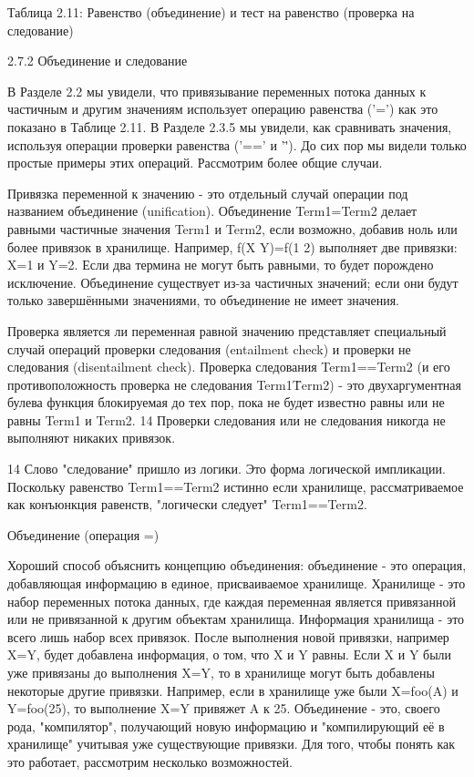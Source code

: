Таблица 2.11: Равенство (объединение) и тест на равенство (проверка на следование)

2.7.2 Объединение и следование

В Разделе 2.2 мы увидели, что привязывание переменных потока данных к частичным и другим значениям использует операцию равенства ('=') как это показано в Таблице 2.11. В Разделе 2.3.5 мы увидели, как сравнивать значения, используя операции проверки равенства ('==' и '\='). До сих пор мы видели только простые примеры этих операций. Рассмотрим более общие случаи.

Привязка переменной к значению - это отдельный случай операции под названием объединение (unification). Объединение Term1=Term2 делает равными частичные значения Term1 и Term2, если возможно, добавив ноль или более привязок в хранилище. Например, f(X Y)=f(1 2) выполняет две привязки: X=1 и Y=2. Если два термина не могут быть равными, то будет порождено исключение. Объединение существует из-за частичных значений; если они будут только завершёнными значениями, то объединение не имеет значения.

Проверка является ли переменная равной значению представляет специальный случай операций проверки следования (entailment check) и проверки не следования (disentailment check). Проверка следования Term1==Term2 (и его противоположность проверка не следования Term1\=Term2) - это двухаргументная булева функция блокируемая до тех пор, пока не будет известно равны или не равны Term1 и Term2. 14 Проверки следования или не следования никогда не выполняют никаких привязок.

14 Слово "следование" пришло из логики. Это форма логической импликации. Поскольку равенство Term1==Term2 истинно если хранилище, рассматриваемое как конъюнкция равенств, "логически следует" Term1==Term2.

Объединение (операция =)

Хороший способ объяснить концепцию объединения: объединение - это операция, добавляющая информацию в единое, присваиваемое хранилище. Хранилище - это набор переменных потока данных, где каждая переменная является привязанной или не привязанной к другим объектам хранилища. Информация хранилища - это всего лишь набор всех привязок. После выполнения новой привязки, например X=Y, будет добавлена информация, о том, что X и Y равны. Если X и Y были уже привязаны до выполнения X=Y, то в хранилище могут быть добавлены некоторые другие привязки. Например, если в хранилище уже были X=foo(A) и Y=foo(25), то выполнение X=Y привяжет A к 25. Объединение - это, своего рода, "компилятор", получающий новую информацию и "компилирующий её в хранилище" учитывая уже существующие привязки. Для того, чтобы понять как это работает, рассмотрим несколько возможностей.


